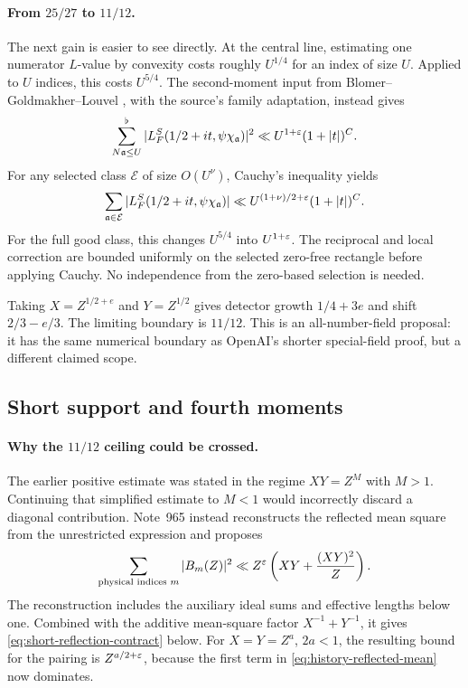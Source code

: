 \paragraph{From $25/27$ to $11/12$.}
The next gain \cite{R959} is easier to see directly. At the central line, estimating one numerator $L$-value by convexity costs roughly $U^{1/4}$ for an index of size $U$. Applied to $U$ indices, this costs $U^{5/4}$. The second-moment input from Blomer--Goldmakher--Louvel \cite{BGL14}, with the source's family adaptation, instead gives
\[
 \sum_{N\mathfrak a\le U}^{\flat}
      |L_F^S(1/2+it,\psi\chi_{\mathfrak a})|^2
       \ll U^{1+\varepsilon}(1+|t|)^C.
\]
For any selected class $\mathcal E$ of size $O(U^\nu)$, Cauchy's inequality yields
\begin{equation}\label{eq:progression-M2}
 \sum_{\mathfrak a\in\mathcal E}|L_F^S(1/2+it,\psi\chi_{\mathfrak a})|
       \ll U^{(1+\nu)/2+\varepsilon}(1+|t|)^C.
\end{equation}
For the full good class, this changes $U^{5/4}$ into $U^{1+\varepsilon}$. The reciprocal and local correction are bounded uniformly on the selected zero-free rectangle before applying Cauchy. No independence from the zero-based selection is needed.

Taking $X=Z^{1/2+e}$ and $Y=Z^{1/2}$ gives detector growth $1/4+3e$ and shift $2/3-e/3$. The limiting boundary is $11/12$. This is an all-number-field proposal: it has the same numerical boundary as OpenAI's shorter special-field proof, but a different claimed scope.

\subsection{Short support and fourth moments}

\paragraph{Why the $11/12$ ceiling could be crossed.}
The earlier positive estimate was stated in the regime $XY=Z^M$ with $M>1$. Continuing that simplified estimate to $M<1$ would incorrectly discard a diagonal contribution. Note~965 \cite{R965} instead reconstructs the reflected mean square from the unrestricted expression and proposes
\begin{equation}\label{eq:history-reflected-mean}
 \sum_{\text{physical indices }m}|B_m(Z)|^2
          \ll Z^\varepsilon\left(XY+\frac{(XY)^2}{Z}\right).
\end{equation}
The reconstruction includes the auxiliary ideal sums and effective lengths below one. Combined with the additive mean-square factor $X^{-1}+Y^{-1}$, it gives \eqref{eq:short-reflection-contract} below. For $X=Y=Z^a$, $2a<1$, the resulting bound for the pairing is $Z^{a/2+\varepsilon}$, because the first term in \eqref{eq:history-reflected-mean} now dominates.

